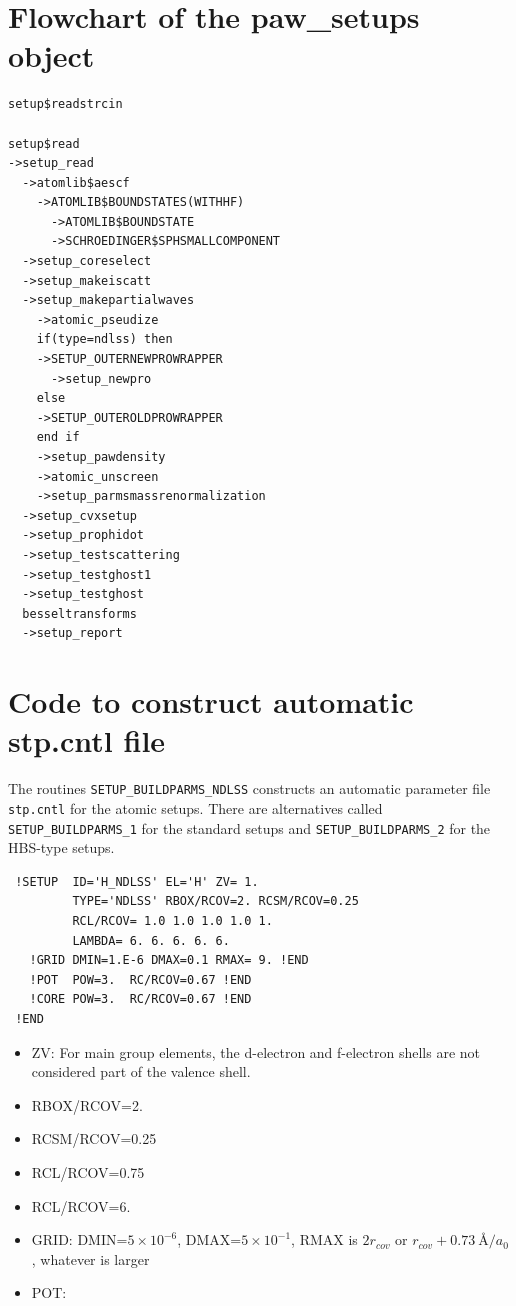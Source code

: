 \documentclass[11pt,a4paper]{report}
\begin{document}
\section{Flowchart of the paw\_setups object}
\begin{verbatim}
setup$readstrcin

setup$read
->setup_read
  ->atomlib$aescf
    ->ATOMLIB$BOUNDSTATES(WITHHF)
      ->ATOMLIB$BOUNDSTATE
      ->SCHROEDINGER$SPHSMALLCOMPONENT
  ->setup_coreselect
  ->setup_makeiscatt
  ->setup_makepartialwaves
    ->atomic_pseudize
    if(type=ndlss) then
    ->SETUP_OUTERNEWPROWRAPPER
      ->setup_newpro
    else
    ->SETUP_OUTEROLDPROWRAPPER
    end if
    ->setup_pawdensity
    ->atomic_unscreen
    ->setup_parmsmassrenormalization
  ->setup_cvxsetup
  ->setup_prophidot
  ->setup_testscattering
  ->setup_testghost1
  ->setup_testghost
  besseltransforms
  ->setup_report
\end{verbatim}


\section{Code to construct automatic stp.cntl file}
The routines \verb|SETUP_BUILDPARMS_NDLSS| constructs an automatic
parameter file \verb|stp.cntl| for the atomic setups. There are
alternatives called \verb|SETUP_BUILDPARMS_1| for the standard setups
and \verb|SETUP_BUILDPARMS_2| for the HBS-type setups.



\begin{verbatim}
 !SETUP  ID='H_NDLSS' EL='H' ZV= 1.
         TYPE='NDLSS' RBOX/RCOV=2. RCSM/RCOV=0.25
         RCL/RCOV= 1.0 1.0 1.0 1.0 1.
         LAMBDA= 6. 6. 6. 6. 6.
   !GRID DMIN=1.E-6 DMAX=0.1 RMAX= 9. !END
   !POT  POW=3.  RC/RCOV=0.67 !END
   !CORE POW=3.  RC/RCOV=0.67 !END
 !END
\end{verbatim}

\begin{itemize}
\item ZV: For main group elements, the d-electron and f-electron
  shells are not considered part of the valence shell.
\item RBOX/RCOV=2.
\item RCSM/RCOV=0.25
\item RCL/RCOV=0.75
\item RCL/RCOV=6.
\item GRID: DMIN=$5\times 10^{-6}$,
DMAX=$5\times 10^{-1}$,
RMAX is $2r_{cov}$ or $r_{cov}+0.73~$\AA$/a_0$, whatever is larger
\item POT:
\end{itemize}
\end{document}
